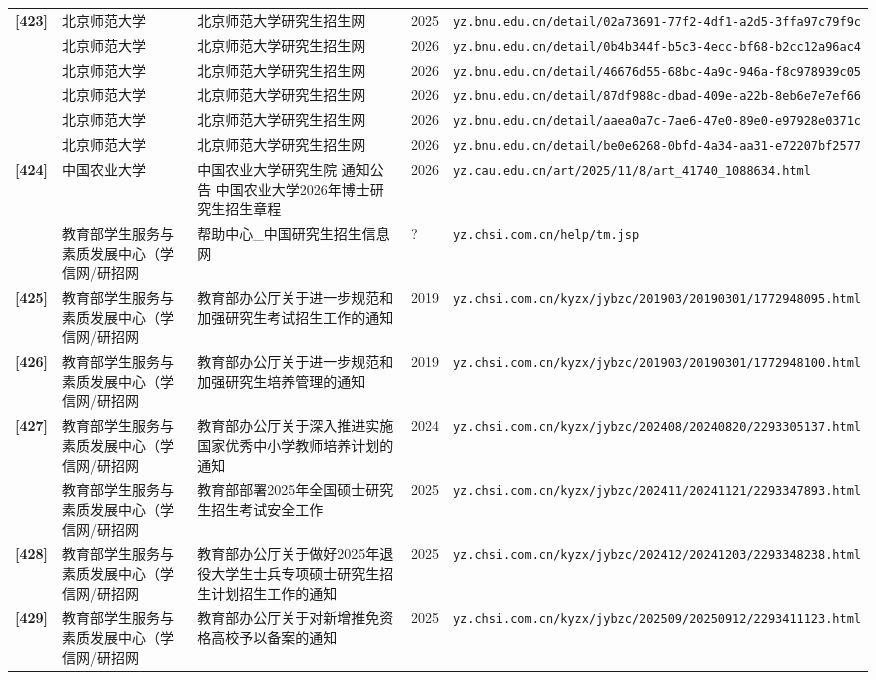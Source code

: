 {\begin{longtable}{@{}p{1.15cm}p{2.9cm}p{6.3cm}p{0.85cm}p{5.0cm}@{}}
\textbf{[423]} & 北京师范大学 & 北京师范大学研究生招生网 & 2025 & \texttt{yz.bnu.edu.cn/detail/02a73691-77f2-4df1-a2d5-3ffa97c79f9c} \\
[0] & 北京师范大学 & 北京师范大学研究生招生网 & 2026 & \texttt{yz.bnu.edu.cn/detail/0b4b344f-b5c3-4ecc-bf68-b2cc12a96ac4} \\
[0] & 北京师范大学 & 北京师范大学研究生招生网 & 2026 & \texttt{yz.bnu.edu.cn/detail/46676d55-68bc-4a9c-946a-f8c978939c05} \\
[0] & 北京师范大学 & 北京师范大学研究生招生网 & 2026 & \texttt{yz.bnu.edu.cn/detail/87df988c-dbad-409e-a22b-8eb6e7e7ef66} \\
[0] & 北京师范大学 & 北京师范大学研究生招生网 & 2026 & \texttt{yz.bnu.edu.cn/detail/aaea0a7c-7ae6-47e0-89e0-e97928e0371c} \\
[0] & 北京师范大学 & 北京师范大学研究生招生网 & 2026 & \texttt{yz.bnu.edu.cn/detail/be0e6268-0bfd-4a34-aa31-e72207bf2577} \\
\textbf{[424]} & 中国农业大学 & 中国农业大学研究生院 通知公告 中国农业大学2026年博士研究生招生章程 & 2026 & \texttt{yz.cau.edu.cn/art/2025/11/8/art\_41740\_1088634.html} \\
[0] & 教育部学生服务与素质发展中心（学信网/研招网 & 帮助中心\_中国研究生招生信息网 & ? & \texttt{yz.chsi.com.cn/help/tm.jsp} \\
\textbf{[425]} & 教育部学生服务与素质发展中心（学信网/研招网 & 教育部办公厅关于进一步规范和加强研究生考试招生工作的通知 & 2019 & \texttt{yz.chsi.com.cn/kyzx/jybzc/201903/20190301/1772948095.html} \\
\textbf{[426]} & 教育部学生服务与素质发展中心（学信网/研招网 & 教育部办公厅关于进一步规范和加强研究生培养管理的通知 & 2019 & \texttt{yz.chsi.com.cn/kyzx/jybzc/201903/20190301/1772948100.html} \\
\textbf{[427]} & 教育部学生服务与素质发展中心（学信网/研招网 & 教育部办公厅关于深入推进实施国家优秀中小学教师培养计划的通知 & 2024 & \texttt{yz.chsi.com.cn/kyzx/jybzc/202408/20240820/2293305137.html} \\
[0] & 教育部学生服务与素质发展中心（学信网/研招网 & 教育部部署2025年全国硕士研究生招生考试安全工作 & 2025 & \texttt{yz.chsi.com.cn/kyzx/jybzc/202411/20241121/2293347893.html} \\
\textbf{[428]} & 教育部学生服务与素质发展中心（学信网/研招网 & 教育部办公厅关于做好2025年退役大学生士兵专项硕士研究生招生计划招生工作的通知 & 2025 & \texttt{yz.chsi.com.cn/kyzx/jybzc/202412/20241203/2293348238.html} \\
\textbf{[429]} & 教育部学生服务与素质发展中心（学信网/研招网 & 教育部办公厅关于对新增推免资格高校予以备案的通知 & 2025 & \texttt{yz.chsi.com.cn/kyzx/jybzc/202509/20250912/2293411123.html} \\

\end{longtable}}
